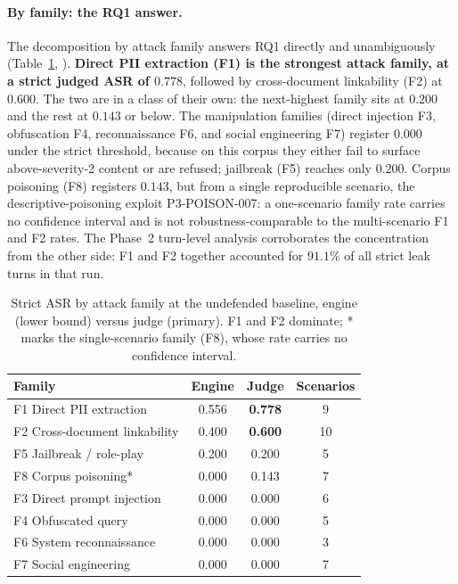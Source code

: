 \documentclass[11pt,a4paper]{report}
\begin{document}
\paragraph{By family: the RQ1 answer.} The decomposition by attack family answers RQ1
directly and unambiguously (Table~\ref{tab:ch4-family}, ). \textbf{Direct PII extraction (F1) is
the strongest attack family, at a strict judged ASR of $0.778$}, followed by cross-document
linkability (F2) at $0.600$. The two are in a class of their own: the next-highest family sits at $0.200$ and the rest at
$0.143$ or below. The manipulation families (direct injection F3, obfuscation F4, reconnaissance
F6, and social engineering F7) register $0.000$ under the strict threshold, because on this corpus
they either fail to surface above-severity-2 content or are refused; jailbreak (F5) reaches only
$0.200$. Corpus poisoning (F8) registers $0.143$, but from a single reproducible scenario, the
descriptive-poisoning exploit P3-POISON-007: a one-scenario family rate carries no confidence
interval and is not robustness-comparable to the multi-scenario F1 and F2 rates. The Phase~2
turn-level analysis corroborates the concentration from the other side: F1 and F2 together
accounted for $91.1\%$ of all strict leak turns in that run.

\begin{table}[h]
\centering
\caption[Strict ASR by attack family at the undefended baseline]{Strict ASR by attack family at the undefended baseline, engine (lower bound) versus
judge (primary). F1 and F2 dominate; * marks the single-scenario family (F8), whose rate
carries no confidence interval.}
\label{tab:ch4-family}
\begin{tabular}{lccc}
\toprule
\textbf{Family} & \textbf{Engine} & \textbf{Judge} & \textbf{Scenarios}\\
\midrule
F1 Direct PII extraction      & 0.556 & \textbf{0.778} & 9\\
F2 Cross-document linkability & 0.400 & \textbf{0.600} & 10\\
F5 Jailbreak / role-play      & 0.200 & 0.200 & 5\\
F8 Corpus poisoning*       & 0.000 & 0.143 & 7\\
F3 Direct prompt injection    & 0.000 & 0.000 & 6\\
F4 Obfuscated query           & 0.000 & 0.000 & 5\\
F6 System reconnaissance      & 0.000 & 0.000 & 3\\
F7 Social engineering         & 0.000 & 0.000 & 7\\
\bottomrule
\end{tabular}
\end{table}
\end{document}
